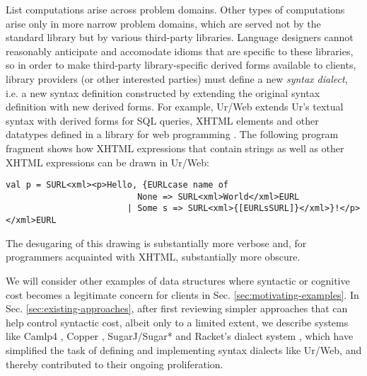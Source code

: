 List computations arise across problem domains. Other types of computations arise only in more narrow problem domains, which are served not by the standard library but by various third-party libraries. Language designers cannot reasonably anticipate and accomodate idioms that are specific to these libraries, so in order to make third-party library-specific derived forms available to clients, library providers (or other interested parties) must define a new \emph{syntax dialect}, i.e. a new syntax definition constructed by extending the original syntax definition with new derived forms. For example, Ur/Web extends Ur's textual syntax with derived forms for SQL queries, XHTML elements and other datatypes defined in a library for web programming \cite{conf/popl/Chlipala15}. The  following program fragment shows how XHTML expressions that contain strings as well as other XHTML expressions can be drawn in Ur/Web: %
\begin{lstlisting}[numbers=none]
val p = SURL<xml><p>Hello, {EURLcase name of
                          None => SURL<xml>World</xml>EURL
                        | Some s => SURL<xml>{[EURLsSURL]}</xml>}!</p></xml>EURL
\end{lstlisting}                              
The desugaring of this drawing is substantially more verbose and, for programmers  acquainted with XHTML, substantially more obscure.

We will consider other examples of data structures where syntactic or cognitive cost becomes a legitimate concern for clients in Sec. \ref{sec:motivating-examples}. In Sec. \ref{sec:existing-approaches}, after first reviewing simpler approaches that can help control syntactic cost, albeit only to a limited extent, we describe systems like Camlp4 \cite{ocaml-manual}, Copper \cite{conf/gpce/WykS07}, SugarJ/Sugar* \cite{erdweg2011sugarj,erdweg2013framework} and Racket's dialect system \cite{Flatt:2012:CLR:2063176.2063195}, which have simplified the task of defining and implementing syntax dialects like Ur/Web, and thereby contributed to their ongoing proliferation.



